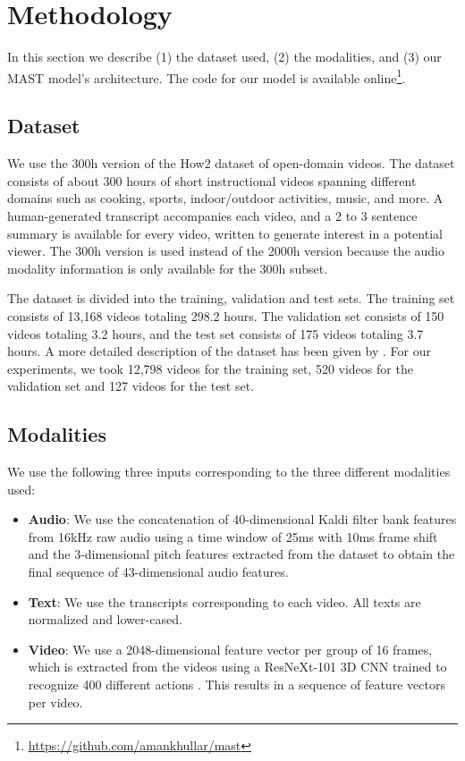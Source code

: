 \documentclass[11pt,a4paper]{article}
\begin{document}
\section{Methodology}
In this section we describe (1) the dataset used, (2) the modalities, and (3) our MAST model's architecture. The code for our model is available online\footnote{\url{https://github.com/amankhullar/mast}}.
\subsection{Dataset}
We use the 300h version of the How2 dataset \cite{sanabria2018how2} of open-domain videos. The dataset consists of about 300 hours of short instructional videos spanning different domains such as cooking, sports, indoor/outdoor activities, music, and more. A human-generated transcript accompanies each video, and a 2 to 3 sentence summary is available for every video, written to generate interest in a potential viewer. The 300h version is used instead of the 2000h version because the audio modality information is only available for the 300h subset.

The dataset is divided into the training, validation and test sets. The training set consists of 13,168 videos totaling 298.2 hours. The validation set consists of 150 videos totaling 3.2 hours, and the test set consists of 175 videos totaling 3.7 hours. A more detailed description of the dataset has been given by \citet{sanabria2018how2}. For our experiments, we took 12,798 videos for the training set, 520 videos for the validation set and 127 videos for the test set.

\subsection{Modalities}
We use the following three inputs corresponding to the three different modalities used:
\vspace{-2.5mm}
\begin{itemize}
    \setlength\itemsep{0.05pt}
    \item \textbf{Audio}: We use the concatenation of 40-dimensional Kaldi \cite{povey2011kaldi} filter bank features from 16kHz raw audio using a time window of 25ms with 10ms frame shift and the 3-dimensional pitch features extracted from the dataset to obtain the final sequence of 43-dimensional audio features.
    \item \textbf{Text}: We use the transcripts corresponding to each video. All texts are normalized and lower-cased.
    \item \textbf{Video}: We use a 2048-dimensional feature vector per group of 16 frames, which is extracted from the videos using a ResNeXt-101 3D CNN trained to recognize 400 different actions \cite{hara2018can}. This results in a sequence of feature vectors per video.
\end{itemize}
\end{document}
